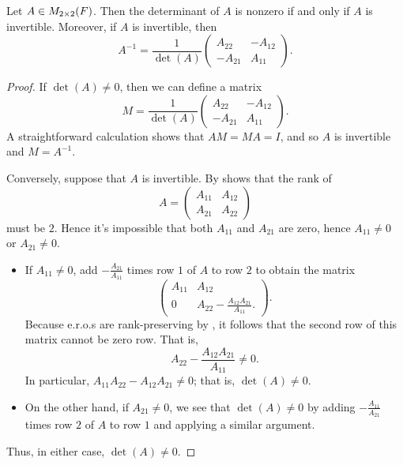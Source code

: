 \begin{theorem} \label{thm 4.2}
Let \(A \in M_{2 \times 2}(F)\).
Then the determinant of \(A\) is nonzero if and only if \(A\) is invertible.
Moreover, if \(A\) is invertible, then
\[
    A^{-1} = \frac{1}{\det(A)}\left(\begin{array}{rr}
                A_{22} & -A_{12} \\
                -A_{21} & A_{11}
            \end{array}\right).
\]
\end{theorem}

\begin{proof}
If \(\det(A) \ne 0\), then we can define a matrix
\[
    M = \frac{1}{\det(A)}\left(\begin{array}{rr}
            A_{22} & -A_{12} \\
            -A_{21} & A_{11}
        \end{array}\right).
\]
A straightforward calculation shows that \(AM = MA = I\), and so \(A\) is invertible and \(M = A^{-1}\).

Conversely, suppose that \(A\) is invertible.
By  shows that the rank of
\[
    A = \begin{pmatrix} A_{11} & A_{12} \\ A_{21} & A_{22} \end{pmatrix}
\]
must be \(2\).
Hence it's impossible that both \(A_{11}\) and \(A_{21}\) are zero, hence \(A_{11} \ne 0\) or \(A_{21} \ne 0\).
\begin{itemize}
    \item If \(A_{11} \ne 0\), add \(-\frac{A_{21}}{A_{11}}\) times row \(1\) of \(A\) to row \(2\) to obtain the matrix
    \[
        \begin{pmatrix}
            A_{11} & A_{12} \\
            0 & A_{22} - \frac{A_{12}A_{21}}{A_{11}}.
        \end{pmatrix}.
    \]
    Because e.r.o.s are rank-preserving by , it follows that the second row of this matrix cannot be zero row.
    That is,
    \[
        A_{22} - \frac{A_{12}A_{21}}{A_{11}} \ne 0.
    \]
    In particular, \(A_{11} A_{22} - A_{12}A_{21} \ne 0\);
    that is, \(\det(A) \ne 0\).
    
    \item On the other hand, if \(A_{21} \ne 0\), we see that \(\det(A) \ne 0\) by adding \(-\frac{A_{11}}{A_{21}}\) times row \(2\) of \(A\) to row \(1\) and applying a similar argument.
\end{itemize}
Thus, in either case, \(\det(A) \ne 0\).
\end{proof}

